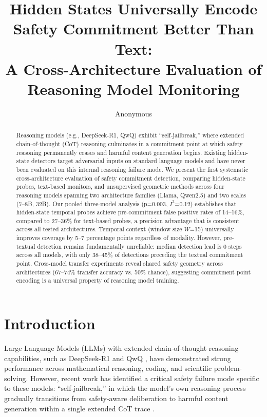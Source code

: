 \documentclass[11pt,a4paper]{article}
\title{Hidden States Universally Encode Safety Commitment Better Than Text:\\A Cross-Architecture Evaluation of Reasoning Model Monitoring}
\author{Anonymous}
\begin{document}
\maketitle

\begin{abstract}
Reasoning models (e.g., DeepSeek-R1, QwQ) exhibit ``self-jailbreak,'' where extended chain-of-thought (CoT) reasoning culminates in a commitment point at which safety reasoning permanently ceases and harmful content generation begins. Existing hidden-state detectors target adversarial inputs on standard language models and have never been evaluated on this internal reasoning failure mode. We present the first systematic cross-architecture evaluation of safety commitment detection, comparing hidden-state probes, text-based monitors, and unsupervised geometric methods across four reasoning models spanning two architecture families (Llama, Qwen2.5) and two scales (7--8B, 32B). Our pooled three-model analysis (p=0.003, $I^2$=0.12) establishes that hidden-state temporal probes achieve pre-commitment false positive rates of 14--16\%, compared to 27--36\% for text-based probes, a precision advantage that is consistent across all tested architectures. Temporal context (window size $W$=15) universally improves coverage by 5--7 percentage points regardless of modality. However, pre-textual detection remains fundamentally unreliable: median detection lead is 0 steps across all models, with only 38--45\% of detections preceding the textual commitment point. Cross-model transfer experiments reveal shared safety geometry across architectures (67--74\% transfer accuracy vs. 50\% chance), suggesting commitment point encoding is a universal property of reasoning model training.
\end{abstract}

\section{Introduction}

Large Language Models (LLMs) with extended chain-of-thought reasoning capabilities, such as DeepSeek-R1 \cite{deepseekr1} and QwQ \cite{qwq}, have demonstrated strong performance across mathematical reasoning, coding, and scientific problem-solving. However, recent work has identified a critical safety failure mode specific to these models: ``self-jailbreak,'' in which the model's own reasoning process gradually transitions from safety-aware deliberation to harmful content generation within a single extended CoT trace \cite{harmthoughts, selfjailbreak}.
\end{document}

